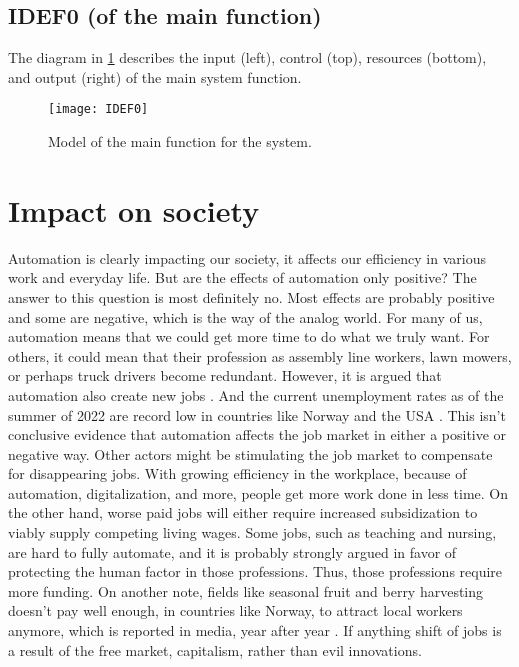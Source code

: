 \documentclass[%
oneside,    %
project,    %
nosummary   %
]{USN-MSc}
\begin{document}
\section{IDEF0 (of the main function)}
\label{sec:IDEF0}

The diagram in \ref{fig:idef0} describes the input (left), control (top), resources (bottom), and output (right) of the main system function.

\begin{figure}[!ht]
  \centering
 \texttt{[image: IDEF0]}
 \caption{Model of the main function for the system.}
 \label{fig:idef0}
\end{figure}

\chapter{Impact on society}
\label{ch:impact}

Automation is clearly impacting our society, it affects our efficiency in various work and everyday life.
But are the effects of automation only positive? The answer to this question is most definitely no.
Most effects are probably positive and some are negative, which is the way of the analog world.
For many of us, automation means that we could get more time to do what we truly want.
For others, it could mean that their profession as assembly line workers, lawn mowers, or perhaps truck drivers become redundant.
However, it is argued that automation also create new jobs \cite{CERNETIC2002167}.
And the current unemployment rates as of the summer of 2022 are record low in countries like Norway \cite{Lavestea6:online} and the USA \cite{Theunemp77:online}.
This isn't conclusive evidence that automation affects the job market in either a positive or negative way.
Other actors might be stimulating the job market to compensate for disappearing jobs.
With growing efficiency in the workplace, because of automation, digitalization, and more, people get more work done in less time.
On the other hand, worse paid jobs will either require increased subsidization to viably supply competing living wages.
Some jobs, such as teaching and nursing, are hard to fully automate, and it is probably strongly argued in favor of protecting the human factor in those professions.
Thus, those professions require more funding. On another note, 
fields like seasonal fruit and berry harvesting doesn't pay well enough,
in countries like Norway, to attract local workers anymore, 
which is reported in media, year after year \cite{Toavtrej43:online}.
If anything shift of jobs is a result of the free market, capitalism, rather than evil innovations.
\end{document}
